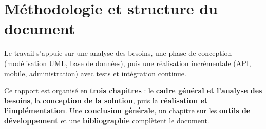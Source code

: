 \section{Méthodologie et structure du document}

Le travail s'appuie sur une analyse des besoins, une phase de conception (modélisation UML, base de données), puis une réalisation incrémentale (API, mobile, administration) avec tests et intégration continue.

Ce rapport est organisé en \textbf{trois chapitres} : le \textbf{cadre général et l'analyse des besoins}, la \textbf{conception de la solution}, puis la \textbf{réalisation et l'implémentation}. Une \textbf{conclusion générale}, un chapitre sur les \textbf{outils de développement} et une \textbf{bibliographie} complètent le document.
